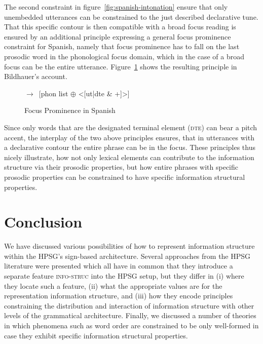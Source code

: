 \documentclass[output=paper]{langsci/langscibook}
\begin{document}
The second constraint in figure~\ref{fig:spanish-intonation} ensure
that only unembedded utterances can be constrained to the just
described declarative tune. That this specific contour is then
compatible with a broad focus reading is ensured by an additional
principle expressing a general focus prominence constraint for
Spanish, namely that focus prominence has to fall on the last prosodic
word in the phonological focus domain, which in the case of a broad
focus can be the entire utterance. Figure~\ref{fig:focus-prominence}
shows the resulting principle in Bildhauer's account.
\begin{figure}[htp]
  \centering
  \begin{avm}
$\rightarrow$\
[phon list $\oplus$ <[ut|dte & +]>]
  \end{avm}
  \caption{Focus Prominence in Spanish}
  \label{fig:focus-prominence}
\end{figure}
Since only words
that are the designated terminal element (\textsc{dte}) can bear a
pitch accent, the interplay of the two above principles ensures, that
in utterances with a declarative contour the entire phrase can be in
the focus. These principles thus nicely illustrate, how not only
lexical elements can contribute to the information structure via their
prosodic properties, but how entire phrases with specific prosodic
properties can be constrained to have specific information structural
properties.

\section{Conclusion}
\label{sec:conclusion}

We have discussed various possibilities of how to represent
information structure within the HPSG's sign-based architecture.
Several approaches from the HPSG literature were presented which all
have in common that they introduce a separate feature
\textsc{info-struc} into the HPSG setup, but they differ in (i) where
they locate such a feature, (ii) what the appropriate values are for
the representation information structure, and (iii) how they encode
principles constraining the distribution and interaction of
information structure with other levels of the grammatical
architecture. Finally, we discussed a number of theories in which
phenomena such as word order are constrained to be only well-formed in
case they exhibit specific information structural properties.



\printbibliography[heading=subbibliography,notkeyword=this] 
\end{document}
